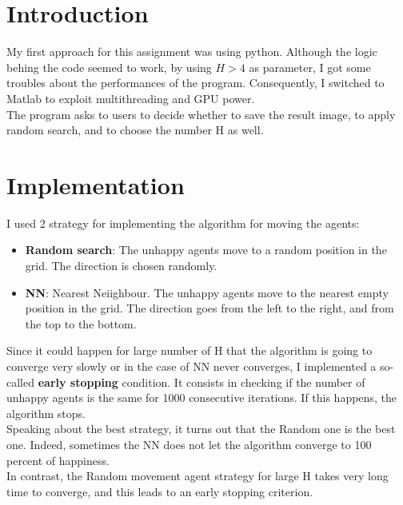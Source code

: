 \documentclass[unicode,11pt,a4paper,oneside,numbers=endperiod,openany]{scrartcl}
\begin{document}
\setassignment

\newline
\section*{Introduction}
My first approach for this assignment was using python. 
Although the logic behing the code seemed to work, by using $H>4$ as parameter, I got some 
troubles about the performances of the program. Consequently, I switched to Matlab to exploit multithreading and GPU power. \\
The program asks to users to decide whether to save the result image, to apply random search, and to choose the number H as well. 
\section*{Implementation}
I used 2 strategy for implementing the algorithm for moving the agents:
\begin{itemize}
    \item \textbf{Random search}: The unhappy agents move to a random position in the grid. The direction is chosen randomly. 
    \item \textbf{NN}: Nearest Neiighbour. The unhappy agents move to the nearest empty position in the grid. The direction goes from the left to the right, and from the top to the bottom.
\end{itemize}


Since it could happen for large number of H that the algorithm is going to converge very slowly or in the case of NN never converges, I implemented a so-called \textbf{early stopping} condition. 
It consists in checking if the number of unhappy agents is the same for 1000 consecutive iterations. If this happens, the algorithm stops. \\
Speaking about the best strategy, it turns out that the Random one is the best one. Indeed, sometimes the NN does not let the algorithm converge to 100 percent of happiness. \\
In contrast, the Random movement agent strategy for large H takes very long time to converge, and this leads to an early stopping criterion.\\
\end{document}
